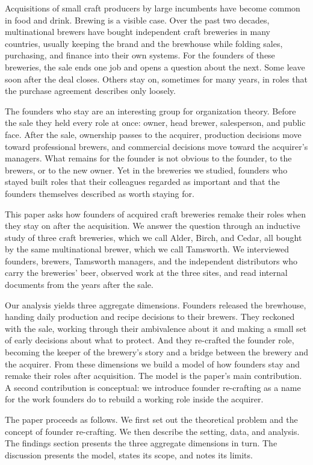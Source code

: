 \documentclass[12pt]{article}
\begin{document}
Acquisitions of small craft producers by large incumbents have become common in food and drink. Brewing is a visible case. Over the past two decades, multinational brewers have bought independent craft breweries in many countries, usually keeping the brand and the brewhouse while folding sales, purchasing, and finance into their own systems. For the founders of these breweries, the sale ends one job and opens a question about the next. Some leave soon after the deal closes. Others stay on, sometimes for many years, in roles that the purchase agreement describes only loosely.

The founders who stay are an interesting group for organization theory. Before the sale they held every role at once: owner, head brewer, salesperson, and public face. After the sale, ownership passes to the acquirer, production decisions move toward professional brewers, and commercial decisions move toward the acquirer's managers. What remains for the founder is not obvious to the founder, to the brewers, or to the new owner. Yet in the breweries we studied, founders who stayed built roles that their colleagues regarded as important and that the founders themselves described as worth staying for.

This paper asks how founders of acquired craft breweries remake their roles when they stay on after the acquisition. We answer the question through an inductive study of three craft breweries, which we call Alder, Birch, and Cedar, all bought by the same multinational brewer, which we call Tamsworth. We interviewed founders, brewers, Tamsworth managers, and the independent distributors who carry the breweries' beer, observed work at the three sites, and read internal documents from the years after the sale.

Our analysis yields three aggregate dimensions. Founders released the brewhouse, handing daily production and recipe decisions to their brewers. They reckoned with the sale, working through their ambivalence about it and making a small set of early decisions about what to protect. And they re-crafted the founder role, becoming the keeper of the brewery's story and a bridge between the brewery and the acquirer. From these dimensions we build a model of how founders stay and remake their roles after acquisition. The model is the paper's main contribution. A second contribution is conceptual: we introduce founder re-crafting as a name for the work founders do to rebuild a working role inside the acquirer.

The paper proceeds as follows. We first set out the theoretical problem and the concept of founder re-crafting. We then describe the setting, data, and analysis. The findings section presents the three aggregate dimensions in turn. The discussion presents the model, states its scope, and notes its limits.
\end{document}
